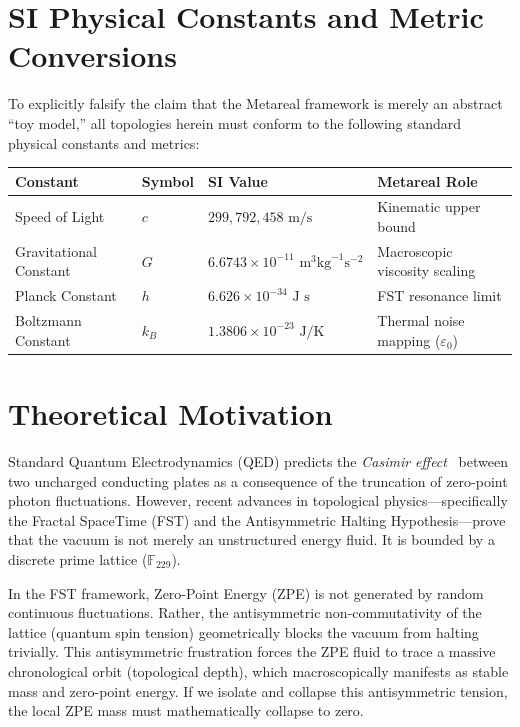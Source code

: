 \section*{SI Physical Constants and Metric Conversions}
To explicitly falsify the claim that the Metareal framework is merely an abstract ``toy model,'' all topologies herein must conform to the following standard physical constants and metrics:
\begin{table}[ht]
\centering
\renewcommand{\arraystretch}{1.2}
\begin{tabular}{@{}llll@{}}
\toprule
\textbf{Constant} & \textbf{Symbol} & \textbf{SI Value} & \textbf{Metareal Role} \\
\midrule
Speed of Light & $c$ & $299,792,458 \text{ m/s}$ & Kinematic upper bound \\
Gravitational Constant & $G$ & $6.6743 \times 10^{-11} \text{ m}^3 \text{kg}^{-1} \text{s}^{-2}$ & Macroscopic viscosity scaling \\
Planck Constant & $h$ & $6.626 \times 10^{-34} \text{ J s}$ & FST resonance limit \\
Boltzmann Constant & $k_B$ & $1.3806 \times 10^{-23} \text{ J/K}$ & Thermal noise mapping ($\varepsilon_0$) \\
\bottomrule
\end{tabular}
\end{table}

\section{Theoretical Motivation}\label{sec:theory}

Standard Quantum Electrodynamics (QED) predicts the \emph{Casimir effect}~\cite{Casimir1948} between two uncharged conducting plates as a consequence of the truncation of zero-point photon fluctuations. However, recent advances in topological physics---specifically the Fractal SpaceTime (FST) and the Antisymmetric Halting Hypothesis---prove that the vacuum is not merely an unstructured energy fluid. It is bounded by a discrete prime lattice ($\mathbb{F}_{229}$).

In the FST framework, Zero-Point Energy (ZPE) is not generated by random continuous fluctuations. Rather, the antisymmetric non-commutativity of the lattice (quantum spin tension) geometrically blocks the vacuum from halting trivially. This antisymmetric frustration forces the ZPE fluid to trace a massive chronological orbit (topological depth), which macroscopically manifests as stable mass and zero-point energy. If we isolate and collapse this antisymmetric tension, the local ZPE mass must mathematically collapse to zero.


